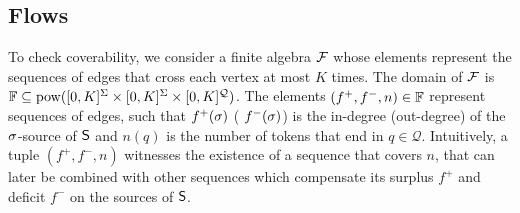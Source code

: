
\subsection{Flows}

To check coverability, we consider a finite algebra $\mathcal{F}$ whose
elements represent the sequences of edges that cross each vertex at
most $K$ times. The domain of $\mathcal{F}$ is $\mathbb{F} \subseteq
{\mathrm{pow}({[0,K]^\Sigma\times [0,K]^\Sigma\times
  [0,K]^\mathcal{Q}})}$. The elements $(f^+,f^-,n) \in \mathbb{F}$
represent sequences of edges, such that $f^+(\sigma)$ (\resp
$f^-(\sigma)$) is the in-degree (\resp out-degree) of the
$\sigma$-source of $\mathsf{S}$ and $n(q)$ is the number of tokens that end
in $q \in \mathcal{Q}$. Intuitively, a tuple $(f^+,f^-,n)$ witnesses
the existence of a sequence that covers $n$, that can later be
combined with other sequences which compensate its surplus $f^+$ and
deficit $f^-$ on the sources of $\mathsf{S}$.

